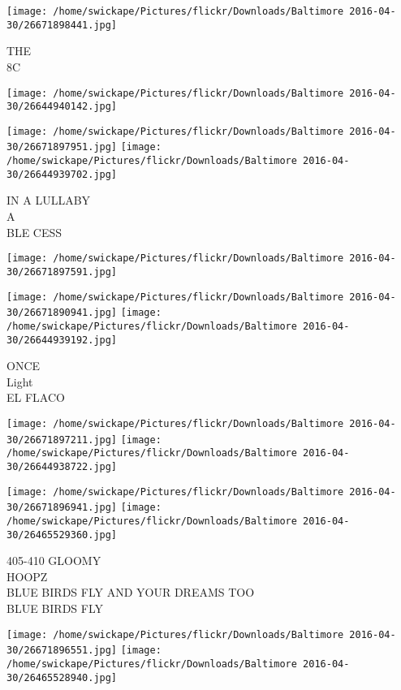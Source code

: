 \documentclass[10pt,letterpaper]{article}
\begin{document}
\vspace{0.25in}
\texttt{[image: /home/swickape/Pictures/flickr/Downloads/Baltimore 2016-04-30/26671898441.jpg]}

THE\\
8C\\
\pagebreak

\texttt{[image: /home/swickape/Pictures/flickr/Downloads/Baltimore 2016-04-30/26644940142.jpg]}

\vspace{0.25in}
\texttt{[image: /home/swickape/Pictures/flickr/Downloads/Baltimore 2016-04-30/26671897951.jpg]}
\texttt{[image: /home/swickape/Pictures/flickr/Downloads/Baltimore 2016-04-30/26644939702.jpg]}

IN A LULLABY\\
A\\
BLE CESS\\
\pagebreak

\texttt{[image: /home/swickape/Pictures/flickr/Downloads/Baltimore 2016-04-30/26671897591.jpg]}

\vspace{0.25in}
\texttt{[image: /home/swickape/Pictures/flickr/Downloads/Baltimore 2016-04-30/26671890941.jpg]}
\texttt{[image: /home/swickape/Pictures/flickr/Downloads/Baltimore 2016-04-30/26644939192.jpg]}

ONCE\\
Light\\
EL FLACO\\
\pagebreak

\texttt{[image: /home/swickape/Pictures/flickr/Downloads/Baltimore 2016-04-30/26671897211.jpg]}
\texttt{[image: /home/swickape/Pictures/flickr/Downloads/Baltimore 2016-04-30/26644938722.jpg]}

\texttt{[image: /home/swickape/Pictures/flickr/Downloads/Baltimore 2016-04-30/26671896941.jpg]}
\texttt{[image: /home/swickape/Pictures/flickr/Downloads/Baltimore 2016-04-30/26465529360.jpg]}

405{-}410 GLOOMY\\
HOOPZ\\
BLUE BIRDS FLY AND YOUR DREAMS TOO\\
BLUE BIRDS FLY\\
\pagebreak

\texttt{[image: /home/swickape/Pictures/flickr/Downloads/Baltimore 2016-04-30/26671896551.jpg]}
\texttt{[image: /home/swickape/Pictures/flickr/Downloads/Baltimore 2016-04-30/26465528940.jpg]}
\end{document}

